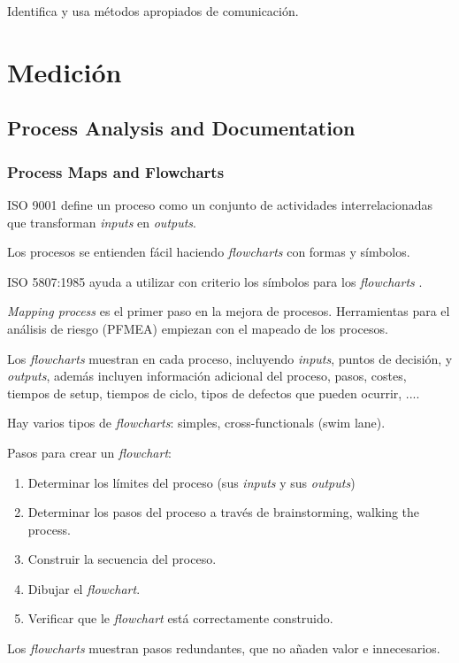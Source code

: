 \documentclass[oneside]{book}
\begin{document}
Identifica y usa métodos apropiados de comunicación.
\pagebreak[4]
\part{Medición}
 
\chapter{Process Analysis and Documentation}

\section{Process Maps and Flowcharts}

ISO 9001 define un proceso como un conjunto de actividades interrelacionadas que transforman \textit{inputs} en \textit{outputs}.

Los procesos se entienden fácil haciendo \textit{flowcharts} con formas y símbolos.

ISO 5807:1985 ayuda a utilizar con criterio los símbolos para los \textit{flowcharts} .

\textit{Mapping process} es el primer paso en la mejora de procesos. Herramientas para el análisis de riesgo (PFMEA) empiezan con el mapeado de los procesos.

Los \textit{flowcharts} muestran en cada proceso, incluyendo \textit{inputs}, puntos de decisión, y \textit{outputs}, además incluyen información adicional del proceso, pasos, costes, tiempos de setup, tiempos de ciclo, tipos de defectos que pueden ocurrir, ....

Hay varios tipos de \textit{flowcharts}: simples, cross-functionals (swim lane).

Pasos para crear un \textit{flowchart}:

\begin{enumerate}
	\item Determinar los límites del proceso (sus \textit{inputs} y sus \textit{outputs})
	\item Determinar los pasos del proceso a través de brainstorming, walking the process.
	\item Construir la secuencia del proceso.
	\item Dibujar el \textit{flowchart}.
	\item Verificar que le \textit{flowchart} está correctamente construido.
\end{enumerate}

Los \textit{flowcharts} muestran pasos redundantes, que no añaden valor e innecesarios. 
\end{document}
